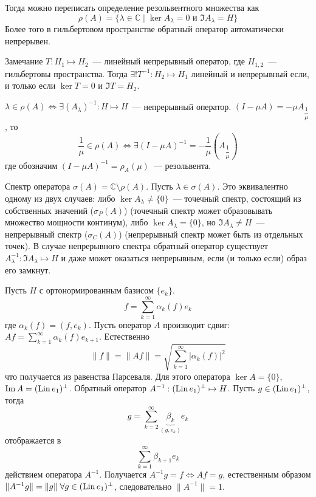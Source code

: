 \documentclass[14pt]{extarticle}
\begin{document}
Тогда можно переписать определение резольвентного множества как 
$$
\rho(A) = \{\lambda \in \mathbb C \mid \ker A_\lambda = 0\text{ и }\Im A_\lambda = H \}
$$
Более того в гильбертовом пространстве обратный оператор автоматически непрерывен.

\begin{MathCl}{Замечание}
    $T:H_1 \mapsto H_2$~--- линейный непрерывный оператор, где $H_{1,2}$~--- гильбертовы пространства.
    Тогда $\exists! T^{-1} : H_2 \mapsto H_1$ линейный и непрерывный если, и только если $\ker T = 0$ и $\Im T = H_2$.
\end{MathCl}

    $\lambda \in \rho(A) \Leftrightarrow \exists(A_\lambda)^{-1} : H \mapsto H$~--- непрерывный оператор.
    $(I - \mu A) = -\mu A_{\dfrac{1}{\mu}}$, то 
    $$
    \dfrac{1}{\mu} \in \rho(A) \Leftrightarrow \exists (I - \mu A)^{-1} = -\dfrac{1}{\mu}(A_{\dfrac{1}{\mu}})
    $$
    где обозначим $(I - \mu A)^{-1} = \rho_A(\mu)$~--- резольвента.
\begin{Opr}
    Спектр оператора $\sigma(A) = \mathbb C \setminus \rho(A)$. Пусть $\lambda \in \sigma(A)$.
    Это эквивалентно одному из двух случаев:
    либо $\ker A_\lambda \ne \{0\}$~--- точечный спектр, состоящий из собственных значений ($\sigma_P(A)$) (точечный спектр может образовывать множество мощности континум),
    либо $\ker A_\lambda = \{0\}$, но $\Im A_\lambda \ne H$~--- непрерывный спектр ($\sigma_C(A)$) (непрерывный спектр может быть из отдельных точек).
    В случае непрерывного спектра обратный оператор существует $A_\lambda^{-1} : \Im A_\lambda \mapsto H$ и даже может оказаться непрерывным, если (и только если) образ его
    замкнут.
\end{Opr}

\begin{Prim}
    Пусть $H$ с ортонормированным базисом $\{e_k\}$.
    $$
    f = \sum \limits_{k = 1}^{\infty} \alpha_k(f) e_k
    $$
    где $\alpha_k(f)=(f, e_k)$.
    Пусть оператор $A$ производит сдвиг: $Af = \sum \limits_{k = 1}^{\infty} \alpha_k(f) e_{k+1}$.
    Естественно 
    $$
    \|f\| = \|Af\| = \sqrt{\sum \limits_{k = 1}^{\infty} |\alpha_k(f)|^2}
    $$
    что получается из равенства Парсеваля.
    Для этого оператора
    $\ker A = \{0\}$, $\operatorname{Im} A = (\operatorname{Lin} e_1)^{\perp}$.
    Обратный оператор
    $A^{-1} : (\operatorname{Lin} e_1)^{\perp} \mapsto H$. Пусть $g \in (\operatorname{Lin} e_1)^{\perp}$, тогда
    $$
    g = \sum \limits_{k = 2}^{\infty}\underbrace{\beta_k}_{(g, e_k)}e_k
    $$ 
    отображается в 
    $$
    \sum\limits_{k = 1}^{\infty} \beta_{k + 1}e_k
    $$
    действием оператора $A^{-1}$.
    Получается $A^{-1}g = f \Leftrightarrow Af = g$, естественным образом $\|A^{-1}g\| = \|g\|\; \forall g \in (\operatorname{Lin} e_1)^{\perp}$, следовательно $\|A^{-1}\| = 1$.
\end{Prim}
\end{document}
